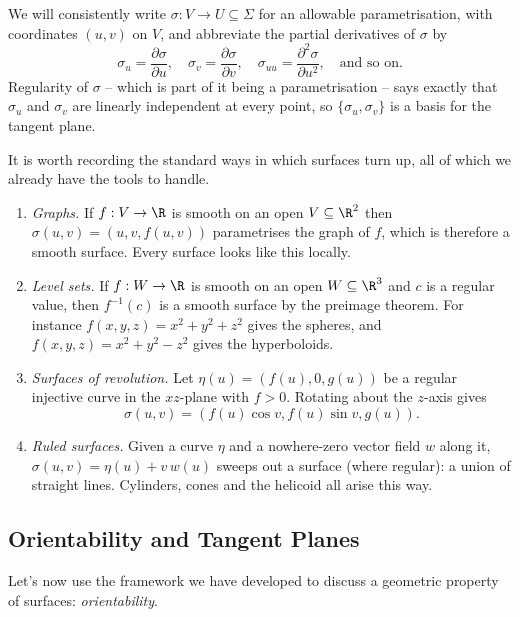 We will consistently write $\sigma: V \rightarrow U \subseteq \Sigma$ for an allowable parametrisation, with coordinates $(u, v)$ on $V$, and abbreviate the partial derivatives of $\sigma$ by
$$
\sigma_u = \frac{\partial\sigma}{\partial u}, \quad \sigma_v = \frac{\partial\sigma}{\partial v}, \quad \sigma_{uu} = \frac{\partial^2 \sigma}{\partial u^2}, \quad \text{and so on.}
$$
Regularity of $\sigma$ -- which is part of it being a parametrisation -- says exactly that $\sigma_u$ and $\sigma_v$ are linearly independent at every point, so $\{\sigma_u, \sigma_v\}$ is a basis for the tangent plane.

It is worth recording the standard ways in which surfaces turn up, all of which we already have the tools to handle.

\begin{example}
    \begin{enumerate}[label=(\roman*)]
        \item \emph{Graphs.} If $f: V \rightarrow \R$ is smooth on an open $V\subseteq\R^2$ then $\sigma(u,v) = (u, v, f(u,v))$ parametrises the graph of $f$, which is therefore a smooth surface. Every surface looks like this locally.
        \item \emph{Level sets.} If $f: W \rightarrow \R$ is smooth on an open $W \subseteq \R^3$ and $c$ is a regular value, then $f^{-1}(c)$ is a smooth surface by the preimage theorem. For instance $f(x,y,z) = x^2+y^2+z^2$ gives the spheres, and $f(x,y,z) = x^2 + y^2 - z^2$ gives the hyperboloids.
        \item \emph{Surfaces of revolution.} Let $\eta(u) = (f(u), 0, g(u))$ be a regular injective curve in the $xz$-plane with $f > 0$. Rotating about the $z$-axis gives
        $$
        \sigma(u, v) = \left(f(u)\cos v, f(u) \sin v, g(u)\right).
        $$
        \item \emph{Ruled surfaces.} Given a curve $\eta$ and a nowhere-zero vector field $w$ along it, $\sigma(u,v) = \eta(u) + v\, w(u)$ sweeps out a surface (where regular): a union of straight lines. Cylinders, cones and the helicoid all arise this way.
    \end{enumerate}
\end{example}

\subsection{Orientability and Tangent Planes}

Let's now use the framework we have developed to discuss a geometric property of surfaces: \emph{orientability}.

